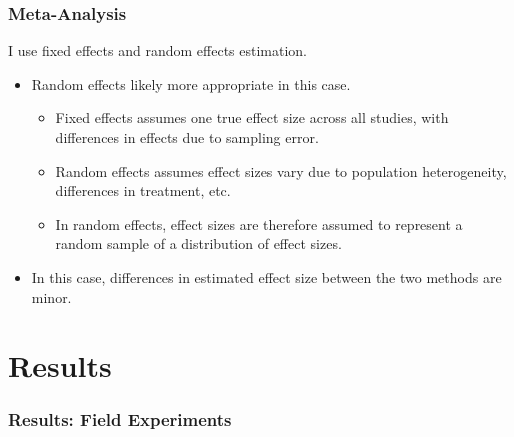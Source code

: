 \documentclass[usenames,dvipsnames]{beamer}
\begin{document}

\begin{frame}[label = methods_2]
\frametitle{Meta-Analysis}
I use \textcolor{Cerulean}{fixed effects} and \textcolor{Cerulean}{random effects} estimation. 
\vspace{0.25cm}
\pause
\begin{itemize}
\item Random effects likely more appropriate in this case. 
\begin{itemize}
\item Fixed effects assumes one true effect size across all studies, with differences in effects due to sampling error.  \hyperlink{fixed_random}{}
\item Random effects assumes effect sizes vary due to population heterogeneity, differences in treatment, etc.
\item In random effects, effect sizes are therefore assumed to represent a random sample of a distribution of effect sizes.
\end{itemize}
\vspace{0.25cm}
\item In this case, differences in estimated effect size between the two methods are minor. 
\end{itemize}
\end{frame}


\section{Results}

\begin{frame}
\frametitle{Results: Field Experiments}


\end{frame}
\end{document}

